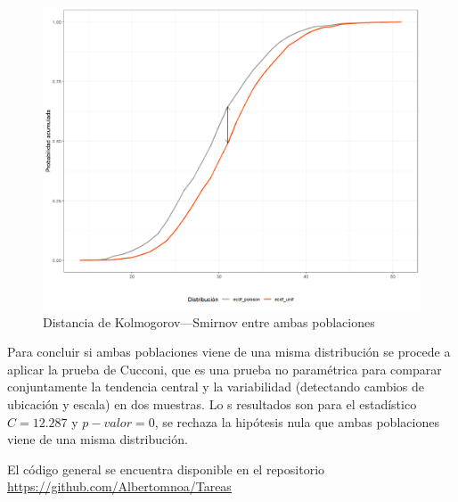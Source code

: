 \documentclass{article}
\begin{document}
\begin{center}
\begin{figure}
\includegraphics[scale=0.6]{figuras/distanciaKolmPU.png}
\caption{Distancia de Kolmogorov–--Smirnov entre ambas poblaciones}
\label{fig:6}
\end{figure}
\end{center}
 Para concluir si ambas poblaciones viene de una misma distribución se procede a aplicar la prueba de Cucconi, que es una prueba no paramétrica para comparar conjuntamente la tendencia central y la variabilidad (detectando cambios de ubicación y escala) en dos muestras. Lo s resultados son para el estadístico $C = 12.287$ y $p-valor = 0$, se rechaza la hipótesis nula que ambas poblaciones viene de una misma distribución.


El código general se encuentra disponible en el repositorio \href{https://github.com/Albertomnoa/Tareas_MPA/tree/master/Tarea3}{https://github.com/Albertomnoa/Tareas} 

\newpage


\end{document}
